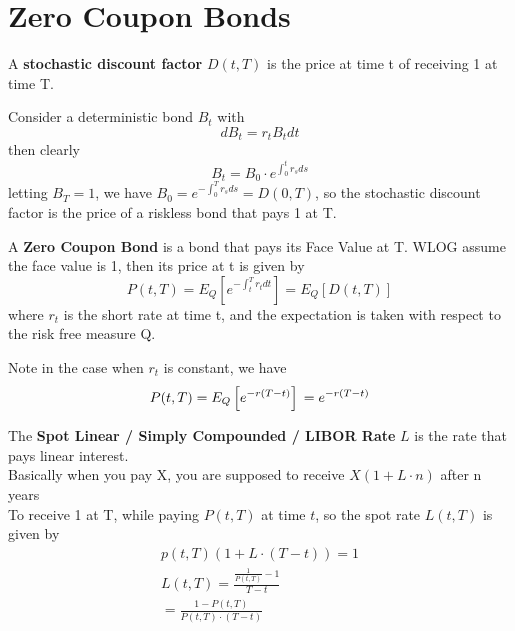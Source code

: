 \section{Zero Coupon Bonds}
\begin{definition}
    A \textbf{stochastic discount factor} $D(t, T)$ is the price at time t of receiving 1 at time T.

    Consider a deterministic bond $B_t$ with 
    \begin{equation}
        dB_t = r_t B_t dt
    \end{equation}
    then clearly
    \begin{equation}
        B_t = B_0 \cdot e^{\int_{0}^{t} r_s ds} 
    \end{equation}
    letting $B_T = 1$, we have $ B_0 = e^{-\int_{0}^{T} r_s ds} = D(0, T)$, so the stochastic discount factor is the price of a riskless bond that pays 1 at T.
\end{definition}
\begin{definition}
    A \textbf{Zero Coupon Bond} is a bond that pays its Face Value at T. 
    WLOG assume the face value is 1, then its price at t is given by
    \begin{equation}
        P(t, T) = E_Q\left[ e^{-\int_{t}^{T} r_t dt }\right] = E_Q\left[ D(t, T) \right]
    \end{equation}
    where $r_t$ is the short rate at time t, and the expectation is taken with respect to the risk free measure Q.

    Note in the case when $r_t$ is constant, we have
    \begin{equation}
        P(t, T) = E_Q\left[ e^{-r(T - t)} \right] \\
        = e^{-r(T - t)}
    \end{equation}
\end{definition}

\begin{definition}
    The \textbf{Spot Linear / Simply Compounded / LIBOR Rate} $L$ is the rate that pays linear interest. \\
    Basically when you pay X, you are supposed to receive $X(1 + L \cdot n)$ after n years \\
    To receive 1 at T, while paying $P(t, T)$ at time $t$, so the spot rate $L(t, T)$ is given by
    \begin{align*}
        p(t, T) (1 + L \cdot (T - t)) = 1 \\
        L(t, T) = \frac{\frac{1}{P(t, T)} - 1}{T - t} \\
        = \frac{1 - P(t, T)}{P(t, T) \cdot (T - t)}
    \end{align*}

\end{definition}

